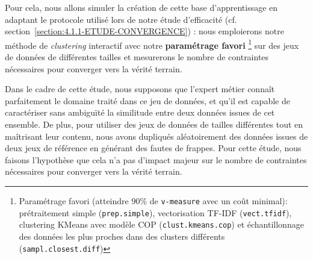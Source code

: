 			Pour cela, nous allons simuler la création de cette base d'apprentissage en adaptant le protocole utilisé lors de notre étude d'efficacité (cf. section~\ref{section:4.1.1-ETUDE-CONVERGENCE}) :
			nous emploierons notre méthode de \textit{clustering} interactif avec notre \textbf{paramétrage favori}
			\footnote{Paramétrage favori (atteindre $90$\% de \texttt{v-measure} avec un coût minimal): prétraitement simple (\texttt{prep.simple}), vectorisation TF-IDF (\texttt{vect.tfidf}), clustering KMeans avec modèle COP (\texttt{clust.kmeans.cop}) et échantillonnage des données les plus proches dans des clusters différents (\texttt{sampl.closest.diff})}
			sur des jeux de données de différentes tailles et mesurerons le nombre de contraintes nécessaires pour converger vers la vérité terrain.
			
			\begin{leftBarWarning}
				Dans le cadre de cette étude, nous supposons que l'expert métier connaît parfaitement le domaine traité dans ce jeu de données, et qu'il est capable de caractériser sans ambiguïté la similitude entre deux données issues de cet ensemble.
				De plus, pour utiliser des jeux de données de tailles différentes tout en maîtrisant leur contenu, nous avons dupliqués aléatoirement des données issues de deux jeux de référence en générant des fautes de frappes.
				Pour cette étude, nous faisons l'hypothèse que cela n'a pas d'impact majeur sur le nombre de contraintes nécessaires pour converger vers la vérité terrain.
			\end{leftBarWarning}
			
